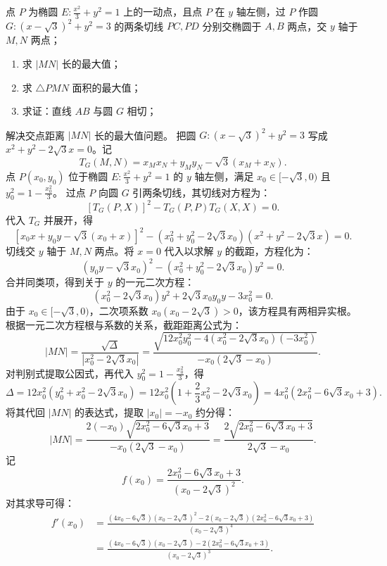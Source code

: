 \begin{example}
点 \(P\) 为椭圆 \(E: \frac{x^2}{3} + y^2 = 1\) 上的一动点，且点 \(P\) 在 \(y\) 轴左侧，过 \(P\) 作圆 \(G: (x-\sqrt{3})^2 + y^2 = 3\) 的两条切线 \(PC,PD\) 分别交椭圆于 \(A,B\) 两点，交 \(y\) 轴于 \(M,N\) 两点；
\begin{enumerate}
    \item[(1)] 求 \(|MN|\) 长的最大值；
    \item[(2)] 求 \(\triangle PMN\) 面积的最大值；
    \item[(3)] 求证：直线 \(AB\) 与圆 \(G\) 相切；
\end{enumerate}
\end{example}
\begin{solution}
解决交点距离 $|MN|$ 长的最大值问题。
把圆 $G: (x-\sqrt{3})^2 + y^2 = 3$ 写成 $x^2 + y^2 - 2\sqrt{3}x = 0$。记
\[ T_G(M, N) = x_M x_N + y_M y_N - \sqrt{3}(x_M + x_N). \]
点 $P(x_0, y_0)$ 位于椭圆 $E: \frac{x^2}{3} + y^2 = 1$ 的 $y$ 轴左侧，满足 $x_0 \in [-\sqrt{3}, 0)$ 且 $y_0^2 = 1 - \frac{x_0^2}{3}$。
过点 $P$ 向圆 $G$ 引两条切线，其切线对方程为：
\[ [T_G(P, X)]^2 - T_G(P, P)T_G(X, X) = 0. \]
代入 $T_G$ 并展开，得
\[ [x_0 x + y_0 y - \sqrt{3}(x_0 + x)]^2 - (x_0^2 + y_0^2 - 2\sqrt{3}x_0)(x^2 + y^2 - 2\sqrt{3}x) = 0. \]
切线交 $y$ 轴于 $M, N$ 两点。将 $x=0$ 代入以求解 $y$ 的截距，方程化为：
\[ (y_0 y - \sqrt{3}x_0)^2 - (x_0^2 + y_0^2 - 2\sqrt{3}x_0)y^2 = 0. \]
合并同类项，得到关于 $y$ 的一元二次方程：
\[ (x_0^2 - 2\sqrt{3}x_0)y^2 + 2\sqrt{3}x_0 y_0 y - 3x_0^2 = 0. \]
由于 $x_0 \in [-\sqrt{3}, 0)$，二次项系数 $x_0(x_0 - 2\sqrt{3}) > 0$，该方程具有两相异实根。根据一元二次方程根与系数的关系，截距距离公式为：
\[ |MN| = \frac{\sqrt{\Delta}}{|x_0^2 - 2\sqrt{3}x_0|} = \frac{\sqrt{12x_0^2 y_0^2 - 4(x_0^2 - 2\sqrt{3}x_0)(-3x_0^2)}}{-x_0(2\sqrt{3} - x_0)}. \]
对判别式提取公因式，再代入 $y_0^2 = 1 - \frac{x_0^2}{3}$，得
\[ \Delta = 12x_0^2(y_0^2 + x_0^2 - 2\sqrt{3}x_0) = 12x_0^2 \left(1 + \frac{2}{3}x_0^2 - 2\sqrt{3}x_0 \right) = 4x_0^2 (2x_0^2 - 6\sqrt{3}x_0 + 3). \]
将其代回 $|MN|$ 的表达式，提取 $|x_0| = -x_0$ 约分得：
\[ |MN| = \frac{2(-x_0)\sqrt{2x_0^2 - 6\sqrt{3}x_0 + 3}}{-x_0(2\sqrt{3} - x_0)} = \frac{2\sqrt{2x_0^2 - 6\sqrt{3}x_0 + 3}}{2\sqrt{3} - x_0}. \]
记
\[
f(x_0) = \frac{2x_0^2 - 6\sqrt{3}x_0 + 3}{(x_0 - 2\sqrt{3})^2}.
\]
对其求导可得：
\begin{align*}
f'(x_0) &= \frac{(4x_0 - 6\sqrt{3})(x_0 - 2\sqrt{3})^2 - 2(x_0 - 2\sqrt{3})(2x_0^2 - 6\sqrt{3}x_0 + 3)}{(x_0 - 2\sqrt{3})^4} \\
&= \frac{(4x_0 - 6\sqrt{3})(x_0 - 2\sqrt{3}) - 2(2x_0^2 - 6\sqrt{3}x_0 + 3)}{(x_0 - 2\sqrt{3})^3}. 

\end{align*}
\end{solution}

